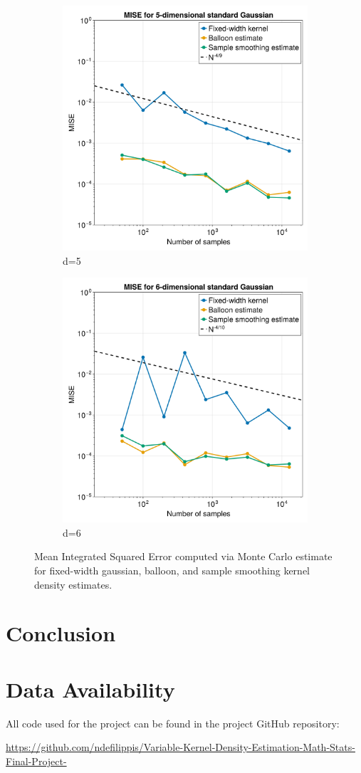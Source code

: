 \documentclass{article}
\begin{document}
\begin{figure}
\begin{subfigure}{.5\textwidth}
  \centering
  \includegraphics[width=.8\linewidth]{images/updated_k_MISE_d=5.png}
  \caption{d=5}
  \label{fig:MISE-5}
\end{subfigure}%
\begin{subfigure}{.5\textwidth}
  \centering
  \includegraphics[width=.8\linewidth]{images/updated_k_MISE_d=6.png}
  \caption{d=6}
  \label{fig:MISE-6}
\end{subfigure}
\caption{Mean Integrated Squared Error computed via Monte Carlo estimate for fixed-width gaussian, balloon, and sample smoothing kernel density estimates.}
\label{fig:MISE}
\end{figure}

\section{Conclusion}

\section{Data Availability}

All code used for the project can be found in the project GitHub repository:

\url{https://github.com/ndefilippis/Variable-Kernel-Density-Estimation-Math-Stats-Final-Project-}

\printbibliography
\end{document}
